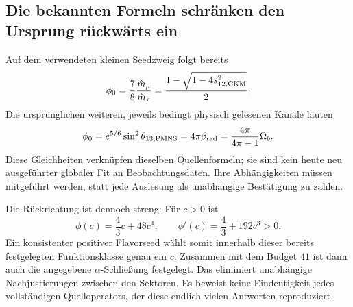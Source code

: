 \subsection{Die bekannten Formeln schränken den Ursprung rückwärts ein}
Auf dem verwendeten kleinen Seedzweig folgt bereits
\begin{equation}
\phi_0=\frac78\frac{\hat m_\mu}{\hat m_\tau}
=\frac{1-\sqrt{1-4s_{12,\rm CKM}^2}}2.
\end{equation}
Die ursprünglichen weiteren, jeweils bedingt physisch gelesenen Kanäle lauten
\begin{equation}
\phi_0=e^{5/6}\sin^2\theta_{13,\rm PMNS}
=4\pi\beta_{\rm rad}
=\frac{4\pi}{4\pi-1}\Omega_b.
\end{equation}
Diese Gleichheiten verknüpfen dieselben Quellenformeln; sie sind kein heute neu ausgeführter globaler Fit an Beobachtungsdaten. Ihre Abhängigkeiten müssen mitgeführt werden, statt jede Auslesung als unabhängige Bestätigung zu zählen.

Die Rückrichtung ist dennoch streng: Für $c>0$ ist
\begin{equation}
\phi(c)=\frac43c+48c^4,\qquad \phi'(c)=\frac43+192c^3>0.
\end{equation}
Ein konsistenter positiver Flavorseed wählt somit innerhalb dieser bereits festgelegten Funktionsklasse genau ein $c$. Zusammen mit dem Budget $41$ ist dann auch die angegebene $\alpha$-Schließung festgelegt. Das eliminiert unabhängige Nachjustierungen zwischen den Sektoren. Es beweist keine Eindeutigkeit jedes vollständigen Quelloperators, der diese endlich vielen Antworten reproduziert.

